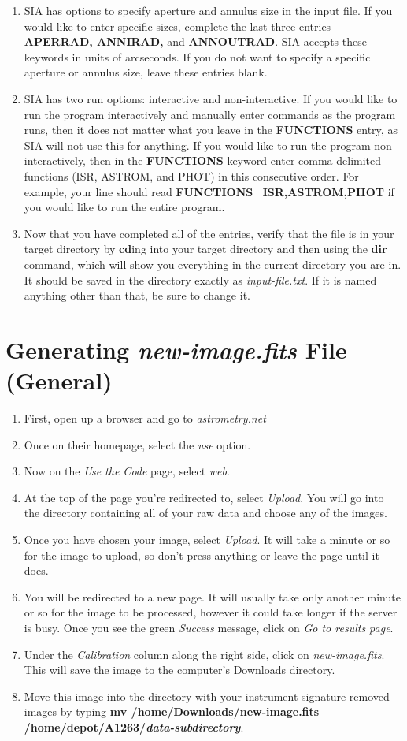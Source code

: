 \documentclass[11pt]{report}
\begin{document}
\begin{enumerate}
\item SIA has options to specify aperture and annulus size in the input file. If you would like to enter specific sizes, complete the last three entries {\bf APERRAD, ANNIRAD,} and {\bf ANNOUTRAD}. SIA accepts these keywords in units of arcseconds. If you do not want to specify a specific aperture or annulus size, leave these entries blank. 
\item SIA has two run options: interactive and non-interactive. If you would like to run the program interactively and manually enter commands as the program runs, then it does not matter what you leave in the {\bf FUNCTIONS} entry, as SIA will not use this for anything. If you would like to run the program non-interactively, then in the {\bf FUNCTIONS} keyword enter comma-delimited functions (ISR, ASTROM, and PHOT) in this consecutive order. For example, your line should read {\bf FUNCTIONS=ISR,ASTROM,PHOT} if you would like to run the entire program. 
\item Now that you have completed all of the entries, verify that the file is in your target directory by {\bf cd}ing into your target directory and then using the {\bf dir} command, which will show you everything in the current directory you are in. It should be saved in the directory exactly as \emph{input-file.txt}. If it is named anything other than that, be sure to change it. 
\end{enumerate}

\section{Generating \emph{new-image.fits} File (General)}
\label{sect:newim}
\begin{enumerate}
\item First, open up a browser and go to \emph{astrometry.net}
\item Once on their homepage, select the \emph{use} option. 
\item Now on the \emph{Use the Code} page, select \emph{web}.
\item At the top of the page you're redirected to, select \emph{Upload}. You will go into the directory containing all of your raw data and choose any of the images.
\item Once you have chosen your image, select \emph{Upload}. It will take a minute or so for the image to upload, so don't press anything or leave the page until it does.
\item You will be redirected to a new page. It will usually take only another minute or so for the image to be processed, however it could take longer if the server is busy. Once you see the green \emph{Success} message, click on \emph{Go to results page}.
\item Under the \emph{Calibration} column along the right side, click on \emph{new-image.fits}. This will save the image to the computer's Downloads directory.
\item Move this image into the directory with your instrument signature removed images by typing {\bf mv /home/Downloads/new-image.fits /home/depot/A1263/\emph{data-subdirectory}}.
\end{enumerate}
\end{document}
